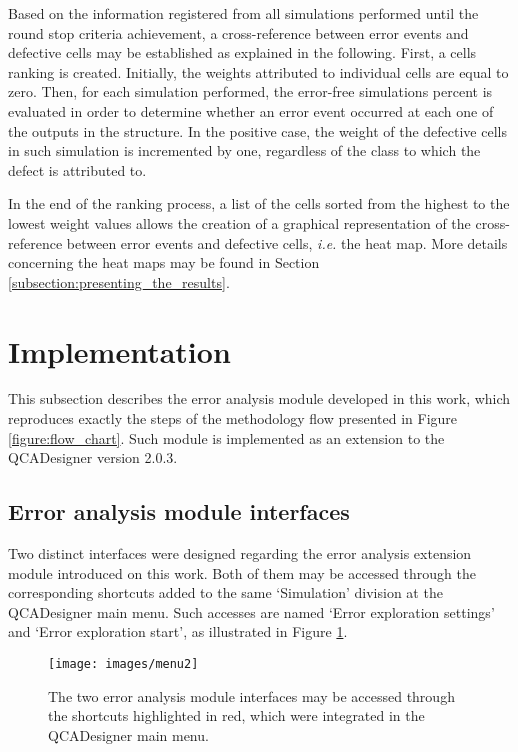 Based on the information registered from all simulations performed until the round stop criteria achievement, a cross-reference between error events and defective cells may be established as explained in the following. First, a cells ranking is created. Initially, the weights attributed to individual cells are equal to zero. Then, for each simulation performed, the error-free simulations percent is evaluated in order to determine whether an error event occurred at each one of the outputs in the structure. In the positive case, the weight of the defective cells in such simulation is incremented by one, regardless of the class to which the defect is attributed to.

In the end of the ranking process, a list of the cells sorted from the highest to the lowest weight values allows the creation of a graphical representation of the cross-reference between error events and defective cells, \textit{i.e.} the heat map.  More details concerning the heat maps may be found in Section \ref{subsection:presenting_the_results}.

\section{Implementation}

This subsection describes the error analysis module developed in this work, which reproduces exactly the steps of the methodology flow presented in Figure \ref{figure:flow_chart}. Such module is implemented as an extension to the QCADesigner version 2.0.3.

\subsection{Error analysis module interfaces}

Two distinct interfaces were designed regarding the error analysis extension module introduced on this work. Both of them may be accessed through the corresponding shortcuts added to the same `Simulation' division at the QCADesigner main menu. Such accesses are named `Error exploration settings' and `Error exploration start', as illustrated in Figure \ref{figure:main_menu}.

\begin{figure}[H]
\center
\texttt{[image: images/menu2]}
\caption{The two error analysis module interfaces may be accessed through the shortcuts highlighted in red, which were integrated in the QCADesigner main menu.}
\label{figure:main_menu}
\end{figure}

